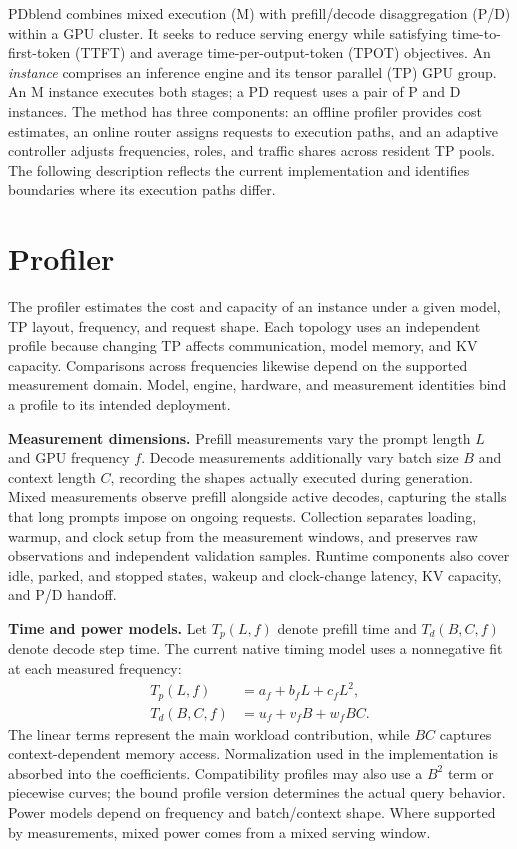 \documentclass[11pt,a4paper,twocolumn]{article}
\newcommand{\para}[1]{\par\noindent\textbf{#1}\enspace}
\begin{document}
\pagestyle{plain}
\raggedbottom
{}

PDblend combines mixed execution (M) with prefill/decode
disaggregation (P/D) within a GPU cluster. It seeks to reduce
serving energy while satisfying time-to-first-token (TTFT) and
average time-per-output-token (TPOT) objectives. An
\emph{instance} comprises an inference engine and its tensor
parallel (TP) GPU group. An M instance executes both stages;
a PD request uses a pair of P and D instances. The method has
three components: an offline profiler provides cost estimates,
an online router assigns requests to execution paths, and an
adaptive controller adjusts frequencies, roles, and traffic
shares across resident TP pools. The following description
reflects the current implementation and identifies boundaries
where its execution paths differ.

\section{Profiler}
\label{sec:profiler}

The profiler estimates the cost and capacity of an instance
under a given model, TP layout, frequency, and request shape.
Each topology uses an independent profile because changing TP
affects communication, model memory, and KV capacity.
Comparisons across frequencies likewise depend on the
supported measurement domain. Model, engine, hardware, and
measurement identities bind a profile to its intended
deployment.

\para{Measurement dimensions.}
Prefill measurements vary the prompt length $L$ and GPU
frequency $f$. Decode measurements additionally vary batch
size $B$ and context length $C$, recording the shapes actually
executed during generation. Mixed measurements observe
prefill alongside active decodes, capturing the stalls that
long prompts impose on ongoing requests. Collection separates
loading, warmup, and clock setup from the measurement windows,
and preserves raw observations and independent validation
samples. Runtime components also cover idle, parked, and
stopped states, wakeup and clock-change latency, KV capacity,
and P/D handoff.

\para{Time and power models.}
Let $T_p(L,f)$ denote prefill time and $T_d(B,C,f)$ denote
decode step time. The current native timing model uses a
nonnegative fit at each measured frequency:
\begin{align}
T_p(L,f)&=a_f+b_fL+c_fL^2,\\
T_d(B,C,f)&=u_f+v_fB+w_fBC.
\end{align}
The linear terms represent the main workload contribution,
while $BC$ captures context-dependent memory access.
Normalization used in the implementation is absorbed into
the coefficients. Compatibility profiles may also use a
$B^2$ term or piecewise curves; the bound profile version
determines the actual query behavior. Power models depend on
frequency and batch/context shape. Where supported by
measurements, mixed power comes from a mixed serving window.
\end{document}
